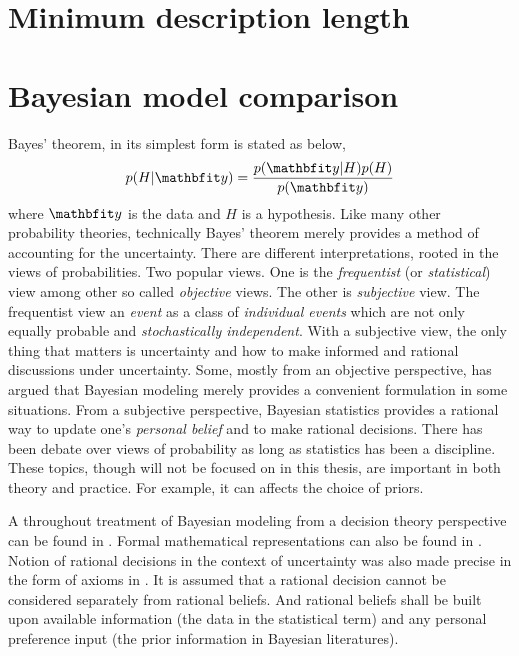\section{Minimum description length}
\label{sec:Minimum description length}


\section{Bayesian model comparison}
\label{sec:Bayesian model comparison}

Bayes' theorem, in its simplest form is stated as below,
\begin{equation}
  p(H|\data) = \frac{p(\data|H)p(H)}{p(\data)} \label{eq:bayes}
\end{equation}
where $\data$ is the data and $H$ is a hypothesis. Like many other probability
theories, technically Bayes' theorem merely provides a method of accounting
for the uncertainty. There are different interpretations, rooted in the views
of probabilities. Two popular views. One is the \emph{frequentist} (or
\emph{statistical}) view among other so called \emph{objective} views. The
other is \emph{subjective} view. The frequentist view an \emph{event} as a
class of \emph{individual events} which are not only equally probable and
\emph{stochastically independent}. With a subjective view, the only thing
that matters is uncertainty and how to make informed and rational discussions
under uncertainty. Some, mostly from an objective perspective, has argued that
Bayesian modeling merely provides a convenient formulation in some situations.
From a subjective perspective, Bayesian statistics provides a rational way to
update one's \emph{personal belief} and to make rational decisions. There has
been debate over views of probability as long as statistics has been a
discipline. These topics, though will not be focused on in this thesis, are
important in both theory and practice. For example, it can affects the choice
of priors.

A throughout treatment of Bayesian modeling from a decision theory perspective
can be found in \cite{Robert:2007tc}. Formal mathematical representations can
also be found in \cite[][sec.~5.1 and sec.~6.1]{Bernardo:1994vd}. Notion of
rational decisions in the context of uncertainty was also made precise in the
form of axioms in \cite{DeFinetti:1974tg,DeFinetti:1975ua}. It is assumed that
a rational decision cannot be considered separately from rational beliefs. And
rational beliefs shall be built upon available information (the data in the
statistical term) and any personal preference input (the prior information in
Bayesian literatures).

